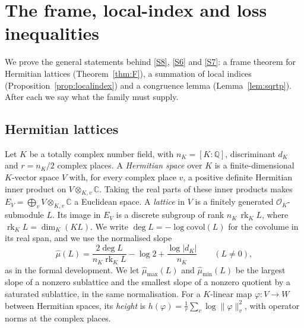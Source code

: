 \documentclass[11pt]{amsart}
\newcommand{\CC}{\mathbb{C}}
\newcommand{\Q}{\mathbb{Q}}
\newcommand{\Oc}{\mathcal{O}}
\DeclareMathOperator{\rk}{rk}
\theoremstyle{plain}
\theoremstyle{definition}
\numberwithin{equation}{section}
\begin{document}
\section{The frame, local-index and loss inequalities}\label{sec:three}

We prove the general statements behind \ref{S8}, \ref{S6} and \ref{S7}: a frame theorem for
Hermitian lattices (Theorem~\ref{thm:F}), a summation of local indices
(Proposition~\ref{prop:localindex}) and a congruence lemma (Lemma~\ref{lem:sqrtp}). After each we
say what the family must supply.

\subsection{Hermitian lattices}

Let $K$ be a totally complex number field, with $n_K=[K:\Q]$, discriminant $d_K$ and $r=n_K/2$
complex places. A \emph{Hermitian space} over $K$ is a finite-dimensional $K$-vector space $V$
with, for every complex place $v$, a positive definite Hermitian inner product on $V\otimes_{K,v}\CC$.
Taking the real parts of these inner products makes $E_V=\bigoplus_v V\otimes_{K,v}\CC$ a Euclidean
space. A \emph{lattice} in $V$ is a finitely generated $\Oc_K$-submodule $L$. Its image in $E_V$ is a
discrete subgroup of rank $n_K\,\rk_K L$, where $\rk_KL=\dim_K(KL)$. We write $\deg L=-\log\mathrm{covol}(L)$
for the covolume in its real span, and we use the normalised slope
\[
\hat\mu(L)=\frac{2\deg L}{n_K\rk_KL}-\log2+\frac{\log|d_K|}{n_K}\qquad(L\ne0),
\]
as in the formal development. We let $\hat\mu_{\max}(L)$ and
$\hat\mu_{\min}(L)$ be the largest slope of a nonzero sublattice and the smallest slope of a nonzero
quotient by a saturated sublattice, in the same normalisation. For a $K$-linear map $\varphi:V\to W$
between Hermitian spaces, its \emph{height} is
$h(\varphi)=\frac1r\sum_v\log\|\varphi\|_v^2$, with operator norms at the complex places.
\end{document}

